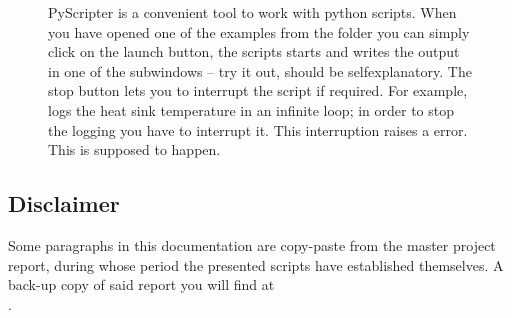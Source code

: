 \begin{figure}
\centering
{}
\caption{PyScripter is a convenient tool
to work with python scripts.
When you have opened one of the examples
from the folder 
you can simply click on the launch button,
the scripts starts and
writes the output in one of the subwindows --
try it out, should be selfexplanatory.
The stop button
lets you to interrupt the script if required.
For example, 
logs the heat sink temperature in an infinite loop;
in order to stop the logging you have to interrupt it.
This interruption raises a  error.
This is supposed to happen.}
\label{img:pyscripter}
\end{figure}

\subsection{Disclaimer}

Some paragraphs in this documentation
are copy-paste from the master project report,
during whose period the presented scripts
have established themselves.
A back-up copy of said report
you will find at \\
.
